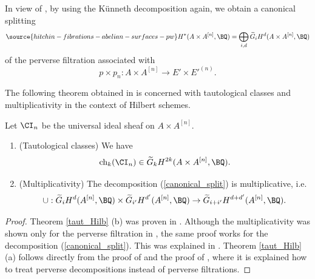  In view of \cite[Proposition 2.1]{Z},  by using the K\"unneth decomposition again, we obtain a canonical splitting
\begin{equation}\label{splitting0}
\source{hitchin-fibrations-abelian-surfaces-pw}
H^\ast(A\times A^{[n]}, \BQ) = \bigoplus_{i,d} \widetilde{G}_i H^d(A \times A^{[n]}, \BQ)
\end{equation}
of the perverse filtration associated with
\[
p \times p_n: A \times A^{[n]} \to E' \times E'^{(n)}.
\]


The following theorem obtained in \cite{Z,SZ} is concerned with  tautological classes and  multiplicativity in the context of Hilbert schemes.

\begin{thm}
\notready\label{taut_Hilb}
Let $\CI_n$ be the universal ideal sheaf on $A \times A^{[n]}$.
\begin{enumerate}
    \item[(a)](Tautological classes) We have
    \[
    \mathrm{ch}_k(\CI_n) \in \widetilde{G}_k H^{2k}(A\times A^{[n]}, \BQ).
    \]
    \item[(b)](Multiplicativity) The decomposition  (\ref{canonical_split}) is multiplicative, i.e.
    \[
   \cup:  \widetilde{G}_i H^d(A^{[n]}, \BQ) \times \widetilde{G}_{i'} H^{d'}(A^{[n]}, \BQ) \to \widetilde{G}_{i+i'}H^{d+d'}(A^{[n]}, \BQ).
    \]
\end{enumerate}
\end{thm}

\begin{proof}
Theorem \ref{taut_Hilb} (b) was proven in \cite{Z}. Although the multiplicativity was shown only for the perverse filtration in \cite{Z}, the same proof works for  the decomposition (\ref{canonical_split}).  This was explained in \cite[Proposition 1.8]{SZ}. Theorem \ref{taut_Hilb} (a) follows directly from the proof of \cite[Theorem 0.1]{SZ} and the proof of \cite[Theorem 3.3]{SZ}, where it is explained how to treat perverse decompositions instead of perverse filtrations.
\end{proof}



